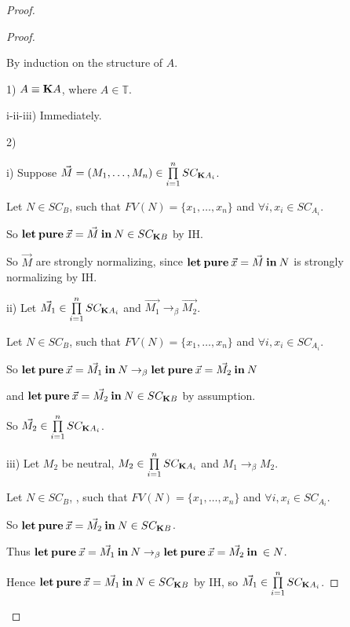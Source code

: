 \documentclass[a4paper]{article}
\begin{document}
\begin{proof}
\begin{proof}
  $ $

  By induction on the structure of $A$.

1) $A \equiv {\bf K}A$, where $A \in \mathbb{T}$.

i-ii-iii) Immediately.

    \vspace{\baselineskip}

2)

i) Suppose $\vec{M} = (M_1,\dots,M_n) \in \prod \limits_{i = 1}^{n} SC_{{\bf K}A_i}$.

Let $N \in SC_{B}$, such that $FV(N) = \{ x_1,\dots, x_n \}$ and $\forall i, x_i \in SC_{A_i}$.

So ${\bf let \: pure \:} \vec{x} = \vec{M} {\: \bf in \: } N \in SC_{{\bf K}B}$ by IH.

So $\vec{M}$ are strongly normalizing, since ${\bf let \: pure \:} \vec{x} = \vec{M} {\: \bf in \: } N$ is strongly normalizing by IH.

\vspace{\baselineskip}

ii) Let $\vec{M_1} \in \prod \limits_{i = 1}^{n} SC_{{\bf K}A_i}$ and $\vec{M_1} \rightarrow_{\beta} \vec{M_2}$.

Let $N \in SC_{B}$, such that $FV(N) = \{ x_1,\dots,x_n \}$ and $\forall i, x_i \in SC_{A_i}$.

So ${\bf let \: pure \:} \vec{x} = \vec{M_1} {\: \bf in \:} N \rightarrow_{\beta} {\bf let \: pure \:} \vec{x} = \vec{M_2} {\: \bf in \:} N$

and ${\bf let \: pure \:} \vec{x} = \vec{M_2} {\: \bf in \:} N \in SC_{{\bf K}B}$ by assumption.

So $\vec{M_2} \in \prod \limits_{i = 1}^{n} SC_{{\bf K}A_i}$.

iii) Let $M_2$ be neutral, $M_2 \in \prod \limits_{i = 1}^{n} SC_{{\bf K}A_i}$ and $M_1 \rightarrow_{\beta} M_2$.

Let $N \in SC_{B}$, , such that $FV(N) = \{ x_1,\dots,x_n \}$ and $\forall i, x_i \in SC_{A_i}$.

So ${\bf let \: pure \:} \vec{x} = \vec{M_2} {\: \bf in \:} N \in SC_{{\bf K}B}$.

Thus ${\bf let \: pure \:} \vec{x} = \vec{M_1} {\: \bf in \:} N \rightarrow_{\beta} {\bf let \: pure \:} \vec{x} = \vec{M_2} {\: \bf in \:} \in N$.

Hence ${\bf let \: pure \:} \vec{x} = \vec{M_1} {\: \bf in \:} N\in SC_{{\bf K}B}$ by IH, so $\vec{M_1} \in \prod \limits_{i = 1}^{n} SC_{{\bf K}A_i}$.
\end{proof}


\end{proof}
\end{document}
